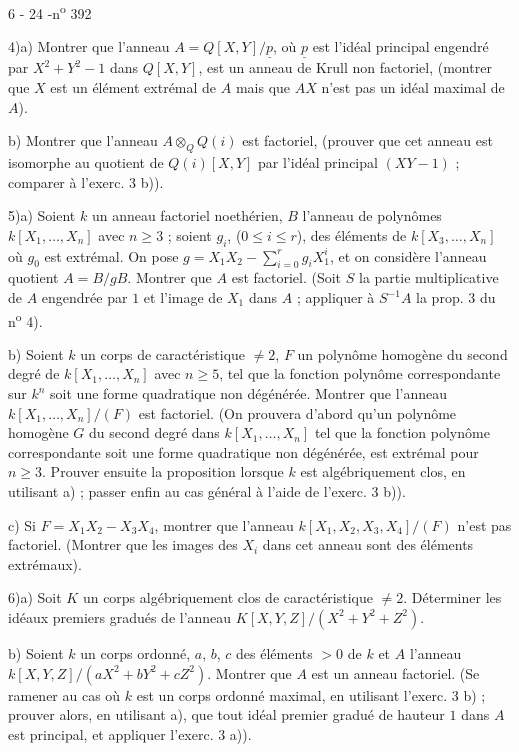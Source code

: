 \begin{center}6 - 24 -\hfill n\textsuperscript{o} 392\end{center}

4)\quad a) Montrer que l'anneau $A=Q[X,Y]/\underline{p}$, où $\underline{p}$ est l'idéal principal engendré par $X^2+Y^2-1$ dans $Q[X,Y]$, est un anneau de Krull non factoriel, (montrer que $X$ est un élément extrémal de $A$ mais que $AX$ n'est pas un idéal maximal de $A$).

b) Montrer que l'anneau $A\otimes_Q Q(i)$ est factoriel, (prouver que cet anneau est isomorphe au quotient de $Q(i)[X,Y]$ par l'idéal principal $(XY-1)$ ; comparer à l'exerc. 3 b)).

5)\quad a) Soient $k$ un anneau factoriel noethérien, $B$ l'anneau de polynômes $k[X_1,\ldots,X_n]$ avec $n\geq 3$ ; soient $g_i$, ($0\leq i\leq r$), des éléments de $k[X_3,\ldots,X_n]$ où $g_0$ est extrémal. On pose $g=X_1X_2-\sum_{i=0}^r g_iX_1^i$, et on considère l'anneau quotient $A=B/gB$. Montrer que $A$ est factoriel. (Soit $S$ la partie multiplicative de $A$ engendrée par $1$ et l'image de $X_1$ dans $A$ ; appliquer à $S^{-1}A$ la prop. 3 du n\textsuperscript{o} 4).

b) Soient $k$ un corps de caractéristique $\ne 2$, $F$ un polynôme homogène du second degré de $k[X_1,\ldots,X_n]$ avec $n\geq 5$, tel que la fonction polynôme correspondante sur $k^n$ soit une forme quadratique non dégénérée. Montrer que l'anneau $k[X_1,\ldots,X_n]/(F)$ est factoriel. (On prouvera d'abord qu'un polynôme homogène $G$ du second degré dans $k[X_1,\ldots,X_n]$ tel que la fonction polynôme correspondante soit une forme quadratique non dégénérée, est extrémal pour $n\geq 3$. Prouver ensuite la proposition lorsque $k$ est algébriquement clos, en utilisant a) ; passer enfin au cas général à l'aide de l'exerc. 3 b)).

c) Si $F=X_1X_2-X_3X_4$, montrer que l'anneau $k[X_1,X_2,X_3,X_4]/(F)$ n'est pas factoriel. (Montrer que les images des $X_i$ dans cet anneau sont des éléments extrémaux).

6)\quad a) Soit $K$ un corps algébriquement clos de caractéristique $\ne 2$. Déterminer les idéaux premiers gradués de l'anneau $K[X,Y,Z]/(X^2+Y^2+Z^2)$.

b) Soient $k$ un corps ordonné, $a$, $b$, $c$ des éléments $>0$ de $k$ et $A$ l'anneau $k[X,Y,Z]/(aX^2+bY^2+cZ^2)$. Montrer que $A$ est un anneau factoriel. (Se ramener au cas où $k$ est un corps ordonné maximal, en utilisant l'exerc. 3 b) ; prouver alors, en utilisant a), que tout idéal premier gradué de hauteur $1$ dans $A$ est principal, et appliquer l'exerc. 3 a)).


